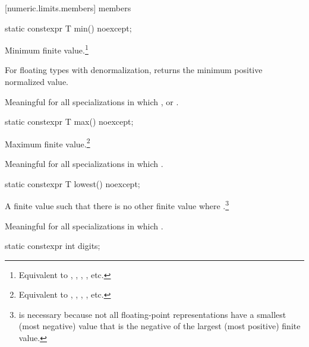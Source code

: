 [numeric.limits.members]{ members}

\begin{itemdecl}
static constexpr T min() noexcept;
\end{itemdecl}

\begin{itemdescr}
\pnum
Minimum finite value.\footnote{Equivalent to , ,
, , etc.}

\pnum
For floating types with denormalization, returns the minimum positive
normalized value.

\pnum
Meaningful for all specializations in which
,
or
.
\end{itemdescr}

\begin{itemdecl}
static constexpr T max() noexcept;
\end{itemdecl}

\begin{itemdescr}
\pnum
Maximum finite value.\footnote{Equivalent to , ,
, , etc.}

\pnum
Meaningful for all specializations in which
.
\end{itemdescr}

\begin{itemdecl}
static constexpr T lowest() noexcept;
\end{itemdecl}

\begin{itemdescr}
\pnum
A finite value  such that there is no other finite
value  where .\footnote{ is necessary because not all
floating-point representations have a smallest (most negative) value that is
the negative of the largest (most positive) finite value.}

\pnum
Meaningful for all specializations in which .
\end{itemdescr}

\begin{itemdecl}
static constexpr int digits;
\end{itemdecl}

